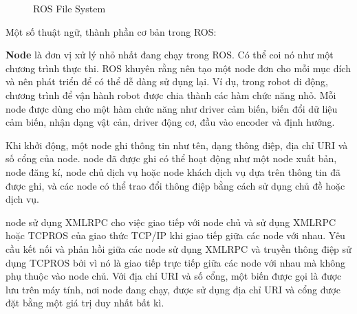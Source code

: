 \begin{figure}[htbp]
  \centering
  \caption{ROS File System}
  \label{fig:ros-filesystem}
\end{figure}

Một số thuật ngữ, thành phần cơ bản trong ROS:

\textbf{Node} là đơn vị xử lý nhỏ nhất đang chạy trong ROS. Có thể coi nó như một chương trình thực thi. ROS khuyên rằng nên tạo một node đơn cho mỗi mục đích và nên phát triển để có thể dễ dàng sử dụng lại. Ví dụ, trong robot di động, chương trình để vận hành robot được chia thành các hàm chức năng nhỏ. Mỗi node được dùng cho một hàm chức năng như driver cảm biến, biến đổi dữ liệu cảm biến, nhận dạng vật cản, driver động cơ, đầu vào encoder và định hướng.

Khi khởi động, một node ghi thông tin như tên, dạng thông điệp, địa chỉ URI và số cổng của node. node đã được ghi có thể hoạt động như một node xuất bản, node đăng kí, node chủ dịch vụ hoặc node khách dịch vụ dựa trên thông tin đã được ghi, và các node có thể trao đổi thông điệp bằng cách sử dụng chủ đề hoặc dịch vụ.

node sử dụng XMLRPC cho việc giao tiếp với node chủ và sử dụng XMLRPC hoặc TCPROS của giao thức TCP/IP khi giao tiếp giữa các node với nhau. Yêu cầu kết nối và phản hồi giữa các node sử dụng XMLRPC và truyền thông điệp sử dụng TCPROS bởi vì nó là giao tiếp trực tiếp giữa các node với nhau mà không phụ thuộc vào node chủ. Với địa chỉ URI và số cổng, một biến được gọi là  được lưu trên máy tính, nơi node đang chạy, được sử dụng địa chỉ URI và cổng được đặt bằng một giá trị duy nhất bất kì.

